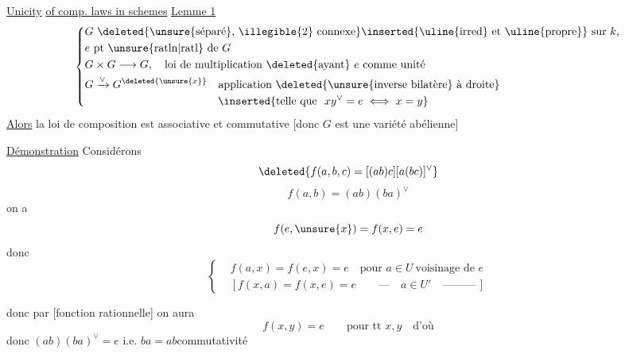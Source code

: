 \uline{Unicity}  \uline{of comp. laws in  schemes}
\uline{Lemme 1}
\[
\left\{\begin{aligned}
&G\ \text{\deleted{\unsure{séparé}, \illegible{2} connexe}\inserted{\uline{irred} et \uline{propre}} sur $k$,}\\
&e\ \text{pt \unsure{ratln|ratl} de $G$}\\
&G\times G\longrightarrow G,\quad\text{loi de multiplication \deleted{ayant} $e$ comme unité}\\
&G\xrightarrow{\vee}G^{\deleted{\unsure{x}}}\quad\text{application \deleted{\unsure{inverse bilatère} à droite}}\\
&\hspace{12em}\inserted{\text{telle que }\ xy^{\vee}=e\iff x=y}
\end{aligned}\right.
\]
\uline{Alors}  la loi de composition est associative et commutative [donc $G$ est une variété abélienne]

\uline{Démonstration} Considérons
\[
\deleted{f(a,b,c)=[(ab)c][a(bc)]^{\vee}}
\]
\[
f(a,b)=(ab)(ba)^{\vee}
\]
on a
\[
f(e,\unsure{x})=f(x,e)=e
\]
donc
\[
\left\{\begin{aligned}
&f(a,x)=f(e,x)=e\quad\text{pour }a\in U\ \text{voisinage de }e\\
&[f(x,a)=f(x,e)=e\qquad\text{---}\quad a\in U'\quad\text{---------}\,]
\end{aligned}\right.
\]

donc par \uline{} [fonction rationnelle] on aura
\[
f(x,y)=e\qquad\text{pour tt }x,y\quad\text{d'où}
\]
donc $(ab)(ba)^{\vee}=e$ i.e. $ba=ab$\hfill commutativité

